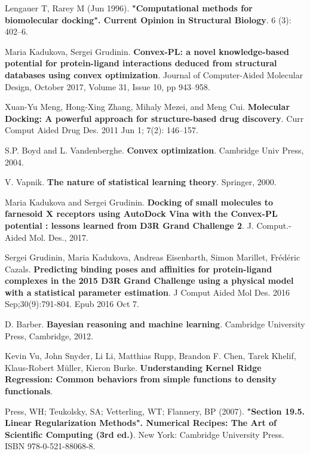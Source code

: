 \documentclass[12pt,twoside]{article}
\begin{document}
\begin{thebibliography}{1}
	Lengauer T, Rarey M (Jun 1996).  
	\textbf{"Computational methods for biomolecular docking". Current Opinion in Structural Biology}. 
	6 (3): 402–6.
	
	Maria Kadukova, Sergei Grudinin.
	\textbf{Convex-PL: a novel knowledge-based potential for protein-ligand interactions deduced from structural databases using convex optimization}.
	Journal of Computer-Aided Molecular Design, October 2017, Volume 31, Issue 10, pp 943–958.
	
	Xuan-Yu Meng, Hong-Xing Zhang, Mihaly Mezei, and Meng Cui.
	\textbf{Molecular Docking: A powerful approach for structure-based drug discovery}.
	Curr Comput Aided Drug Des. 2011 Jun 1; 7(2): 146–157.
	
	S.P. Boyd and L. Vandenberghe.
	\textbf{Convex optimization}.
	Cambridge Univ Press, 2004.
	
	V. Vapnik.
	\textbf{The nature of statistical learning theory}.
	Springer, 2000.
	
	Maria Kadukova and Sergei Grudinin.
	\textbf{Docking of small molecules to farnesoid X receptors using AutoDock Vina with the Convex-PL potential : lessons learned from D3R Grand Challenge 2}.
	J. Comput.-Aided Mol. Des., 2017. 
	
	Sergei Grudinin, Maria Kadukova, Andreas Eisenbarth, Simon Marillet, Frédéric Cazals.
	\textbf{Predicting binding poses and affinities for protein-ligand complexes in the 2015 D3R Grand Challenge using a physical model with a statistical parameter estimation}.
	J Comput Aided Mol Des. 2016 Sep;30(9):791-804. Epub 2016 Oct 7.
	
	D. Barber.
	\textbf{Bayesian reasoning and machine learning}.
	Cambridge University Press, Cambridge, 2012.
	
	Kevin Vu, John Snyder, Li Li, Matthias Rupp, Brandon F. Chen, Tarek Khelif, Klaus-Robert Müller, Kieron Burke.
	\textbf{Understanding Kernel Ridge Regression: Common behaviors from simple functions to density functionals}.
	
	Press, WH; Teukolsky, SA; Vetterling, WT; Flannery, BP (2007).
	\textbf{"Section 19.5. Linear Regularization Methods". Numerical Recipes: The Art of Scientific Computing (3rd ed.)}.
	New York: Cambridge University Press. ISBN 978-0-521-88068-8.
	

\end{thebibliography}
\end{document}
